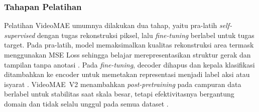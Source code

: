 \subsubsection{Tahapan Pelatihan} \label{II.teori2.4.3}
Pelatihan VideoMAE umumnya dilakukan dua tahap, yaitu pra-latih \textit{self-supervised} dengan tugas rekonstruksi piksel, lalu \textit{fine-tuning} berlabel untuk tugas target. Pada pra-latih, model memaksimalkan kualitas rekonstruksi area termask menggunakan MSE Loss sehingga belajar merepresentasikan struktur gerak dan tampilan tanpa anotasi \cite{Tong2022VideoMAE}. Pada \textit{fine-tuning}, decoder dihapus dan kepala klasifikasi ditambahkan ke encoder untuk memetakan representasi menjadi label aksi atau isyarat \cite{Tong2022VideoMAE}. VideoMAE~V2 menambahkan \textit{post-pretraining} pada campuran data berlabel untuk stabilitas saat skala besar, tetapi efektivitasnya bergantung domain dan tidak selalu unggul pada semua dataset \cite{Wang2023VideoMAEv2}.

